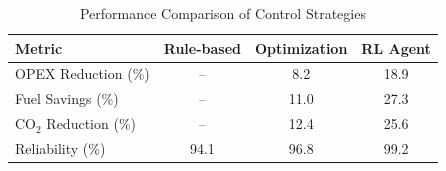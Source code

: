 \begin{table}[htbp]
  \centering
  \caption{Performance Comparison of Control Strategies}
  \begin{tabular}{l c c c}
  \toprule
  Metric & Rule-based & Optimization & RL Agent \\
  \midrule
  OPEX Reduction (\%) & – & 8.2 & 18.9 \\
  Fuel Savings (\%) & – & 11.0 & 27.3 \\
  CO$_2$ Reduction (\%) & – & 12.4 & 25.6 \\
  Reliability (\%) & 94.1 & 96.8 & 99.2 \\
  \bottomrule
  \end{tabular}
  \label{tab:performance-comparison}
\end{table}
